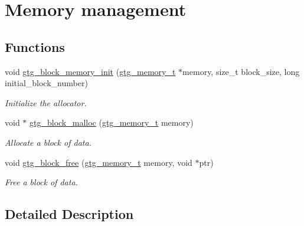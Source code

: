 \hypertarget{group__GTGMemory}{\section{Memory management}
\label{group__GTGMemory}
}
\subsection*{Functions}
\begin{DoxyCompactItemize}
\item 
void \hyperlink{group__GTGMemory_ga5cdc8881f51fa5a160b12cab91cd1a43}{gtg\-\_\-block\-\_\-memory\-\_\-init} (\hyperlink{GTGMemory_8h_ac92a27f812adb022f63f0d6754ec3991}{gtg\-\_\-memory\-\_\-t} $\ast$memory, size\-\_\-t block\-\_\-size, long initial\-\_\-block\-\_\-number)
\begin{DoxyCompactList}\small\item\em Initialize the allocator. \end{DoxyCompactList}\item 
void $\ast$ \hyperlink{group__GTGMemory_ga1a62c5f680d0d46d7fcc82627830d33d}{gtg\-\_\-block\-\_\-malloc} (\hyperlink{GTGMemory_8h_ac92a27f812adb022f63f0d6754ec3991}{gtg\-\_\-memory\-\_\-t} memory)
\begin{DoxyCompactList}\small\item\em Allocate a block of data. \end{DoxyCompactList}\item 
void \hyperlink{group__GTGMemory_ga67019a4108ad51fec4870174c50aa857}{gtg\-\_\-block\-\_\-free} (\hyperlink{GTGMemory_8h_ac92a27f812adb022f63f0d6754ec3991}{gtg\-\_\-memory\-\_\-t} memory, void $\ast$ptr)
\begin{DoxyCompactList}\small\item\em Free a block of data. \end{DoxyCompactList}\end{DoxyCompactItemize}


\subsection{Detailed Description}


